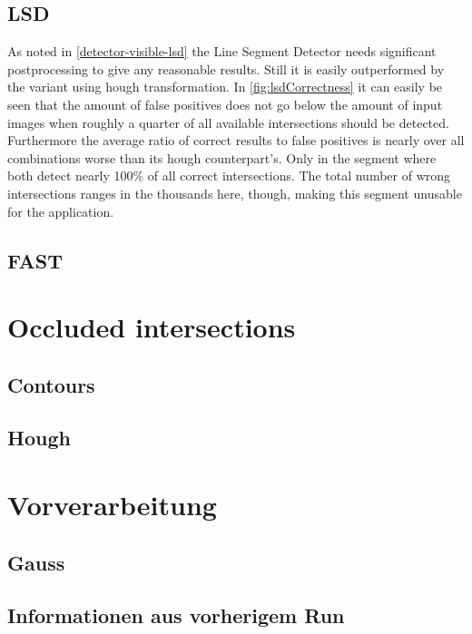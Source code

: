 	\subsection{LSD}
	As noted in \ref{detector-visible-lsd} the Line Segment Detector needs significant postprocessing to give any reasonable results. Still it is easily outperformed by the variant using hough transformation. In \ref{fig:lsdCorrectness} it can easily be seen that the amount of false positives does not go below the amount of input images when roughly a quarter of all available intersections should be detected. Furthermore the average ratio of correct results to false positives is nearly over all combinations worse than its hough counterpart's. Only in the segment where both detect nearly 100\% of all correct intersections. The total number of wrong intersections ranges in the thousands here, though, making this segment unusable for the application.

	\subsection{FAST}

	\section{Occluded intersections}
	\subsection{Contours}
	\subsection{Hough}

	\section{Vorverarbeitung}
	\subsection{Gauss}
	\subsection{Informationen aus vorherigem Run}
